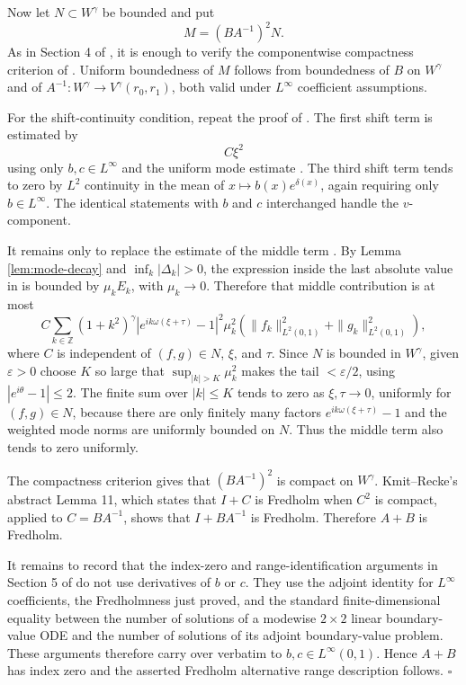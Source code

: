 \documentclass[11pt]{article}
\newcommand{\Z}{\mathbb{Z}}
\newcommand{\eps}{\varepsilon}
\newcommand{\om}{\omega}
\newcommand{\ga}{\gamma}
\newcommand{\de}{\delta}
\newcommand{\Linfty}{L^\infty}
\begin{document}
Now let \(N\subset W^\ga\) be bounded and put
\[
  M=(BA^{-1})^2N .
\]
As in Section 4 of \cite{KmitRecke2007}, it is enough to verify the
componentwise compactness criterion of \cite[Lemma 2]{KmitRecke2007}. Uniform
boundedness of \(M\) follows from boundedness of \(B\) on \(W^\ga\) and of
\(A^{-1}:W^\ga\to V^\ga(r_0,r_1)\), both valid under \(L^\infty\) coefficient
assumptions.

For the shift-continuity condition, repeat the proof of
\cite[Section 4]{KmitRecke2007}. The first shift term is estimated by
\[
  C\xi^2
\]
using only \(b,c\in\Linfty\) and the uniform mode estimate
\cite[(3.9)]{KmitRecke2007}. The third shift term tends to zero by \(L^2\)
continuity in the mean of \(x\mapsto b(x)e^{\de(x)}\), again requiring only
\(b\in\Linfty\). The identical statements with \(b\) and \(c\) interchanged
handle the \(v\)-component.

It remains only to replace the estimate of the middle term
\cite[(4.10)]{KmitRecke2007}. By Lemma \ref{lem:mode-decay} and
\(\inf_k|\Delta_k|>0\), the expression inside the last absolute value in
\cite[(4.10)]{KmitRecke2007} is bounded by \(\mu_kE_k\), with
\(\mu_k\to 0\). Therefore that middle contribution is at most
\[
  C\sum_{k\in\Z}(1+k^2)^\ga
  |e^{ik\om(\xi+\tau)}-1|^2\mu_k^2
  \left(\|f_k\|_{L^2(0,1)}^2+\|g_k\|_{L^2(0,1)}^2\right),
\]
where \(C\) is independent of \((f,g)\in N\), \(\xi\), and \(\tau\). Since
\(N\) is bounded in \(W^\ga\), given \(\eps>0\) choose \(K\) so large that
\(\sup_{|k|>K}\mu_k^2\) makes the tail \(<\eps/2\), using
\(|e^{i\theta}-1|\le 2\). The finite sum over \(|k|\le K\) tends to zero as
\(\xi,\tau\to0\), uniformly for \((f,g)\in N\), because there are only
finitely many factors \(e^{ik\om(\xi+\tau)}-1\) and the weighted mode norms
are uniformly bounded on \(N\). Thus the middle term also tends to zero
uniformly.

The compactness criterion gives that \((BA^{-1})^2\) is compact on \(W^\ga\).
Kmit--Recke's abstract Lemma 11, which states that \(I+C\) is Fredholm when
\(C^2\) is compact, applied to \(C=BA^{-1}\), shows that \(I+BA^{-1}\) is
Fredholm. Therefore \(A+B\) is Fredholm.

It remains to record that the index-zero and range-identification arguments in
Section 5 of \cite{KmitRecke2007} do not use derivatives of \(b\) or \(c\).
They use the adjoint identity for \(L^\infty\) coefficients, the Fredholmness
just proved, and the standard finite-dimensional equality between the number
of solutions of a modewise \(2\times2\) linear boundary-value ODE and the
number of solutions of its adjoint boundary-value problem. These arguments
therefore carry over verbatim to \(b,c\in\Linfty(0,1)\). Hence \(A+B\) has
index zero and the asserted Fredholm alternative range description follows.
\(\square\)
\end{document}
